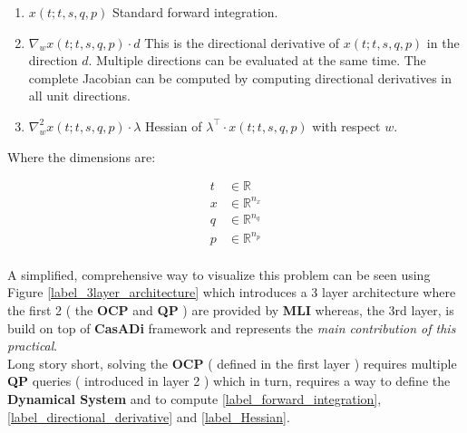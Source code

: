 \documentclass[12pt, letterpaper]{article}
\begin{document}
\begin{enumerate}[label=\textbf{S.\arabic*}]  
\item \label{label_forward_integration} \boldmath$x(t;t,s,q,p)$
        Standard forward integration.
  \item \label{label_directional_derivative} \boldmath$\nabla_{w} x(t;t,s,q,p)\cdot d$
        This is the directional derivative of $x(t;t,s,q,p)$ in the direction $d$. Multiple directions can be evaluated at the same time. The complete Jacobian can be computed by computing directional derivatives in all unit directions.
  \item \label{label_Hessian} \boldmath$\nabla^2_{w} x(t;t,s,q,p) \cdot \lambda$
        Hessian of $\lambda^\top \cdot x(t;t,s,q,p)$ with respect $w$.
\end{enumerate}

Where the dimensions are:

\begin{subequations}
\begin{align}
  t &\in \mathbb{R}                \\
  x &\in \mathbb{R}^{n_x}         \\
  q &\in \mathbb{R}^{n_q}         \\
  p &\in \mathbb{R}^{n_p}         \\
\end{align}
\end{subequations}

A simplified, comprehensive way to visualize this problem can be seen using Figure \ref{label_3layer_architecture} which introduces a 3 layer architecture where the first 2 ( the \textbf{OCP} and \textbf{QP} ) are provided by \textbf{MLI} whereas, the 3rd layer, is build on top of \textbf{CasADi} framework and represents the \textit{main contribution of this practical}. \\

Long story short, solving the \textbf{OCP} ( defined in the first layer ) requires multiple \textbf{QP} queries ( introduced in layer 2 ) which in turn, requires a way to define the \textbf{Dynamical System} and to compute \ref{label_forward_integration}, \ref{label_directional_derivative} and \ref{label_Hessian}.
\end{document}
